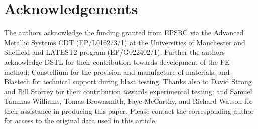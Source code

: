 
\section*{Acknowledgements}
\label{Acknowledgements}
The authors acknowledge the funding granted from EPSRC via the Advanced Metallic Systems CDT (EP/L016273/1) at the Universities of Manchester and Sheffield and LATEST2 program (EP/G022402/1). Further the authors acknowledge DSTL for their contribution towards development of the FE method; Constellium for the provision and manufacture of materials; and Blastech for technical support during blast testing. Thanks also to David Strong and Bill Storrey for their contribution towards experimental testing; and Samuel Tammas-Williams, Tomas Brownsmith, Faye McCarthy, and Richard Watson for their assistance in producing this paper. Please contact the corresponding author for access to the original data used in this article.




